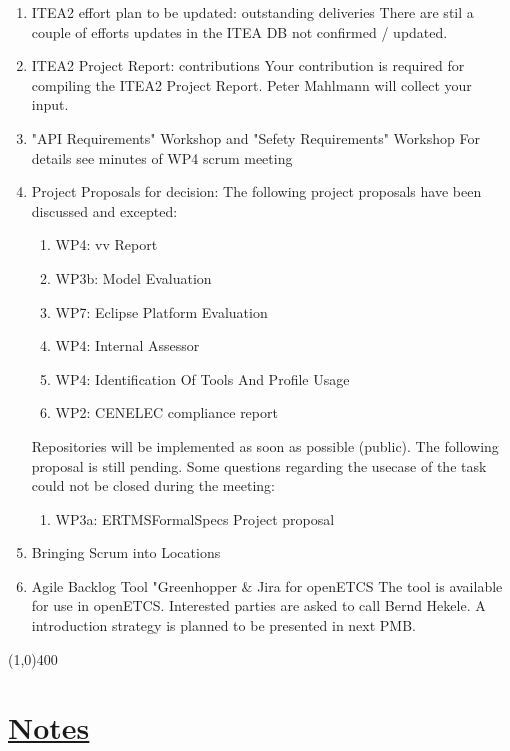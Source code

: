 \documentclass[a4paper]{article}
\begin{document}
\begin{enumerate}

\item ITEA2 effort plan to be updated: outstanding deliveries\newline
There are stil a couple of efforts updates in the ITEA DB not confirmed / updated.

\item ITEA2 Project Report: contributions
Your contribution is required for compiling the ITEA2 Project Report. Peter Mahlmann will collect your input.

\item "API Requirements" Workshop and "Sefety Requirements" Workshop
For details see minutes of WP4 scrum meeting

\item Project Proposals for decision:\newline
The following  project proposals have been discussed and excepted:
\begin{enumerate}
\item WP4: vv Report

\item WP3b: Model Evaluation

\item WP7: Eclipse Platform Evaluation

\item WP4: Internal Assessor

\item WP4: Identification Of Tools And Profile Usage

\item WP2: CENELEC compliance report
\end{enumerate}

Repositories will be implemented as soon as possible (public).\newline
The following proposal is still pending. Some questions regarding the usecase of the task could not be closed during the meeting:

\begin{enumerate}
\item WP3a: ERTMSFormalSpecs Project proposal
\end{enumerate}

\item Bringing Scrum into Locations
\item Agile Backlog Tool "Greenhopper \& Jira for openETCS
The tool is available for use in openETCS. Interested parties are asked to call Bernd Hekele. A introduction strategy is planned to be presented in next PMB.
\end{enumerate}

\line(1,0){400}
\section*{\underline{Notes}}
\end{document}
